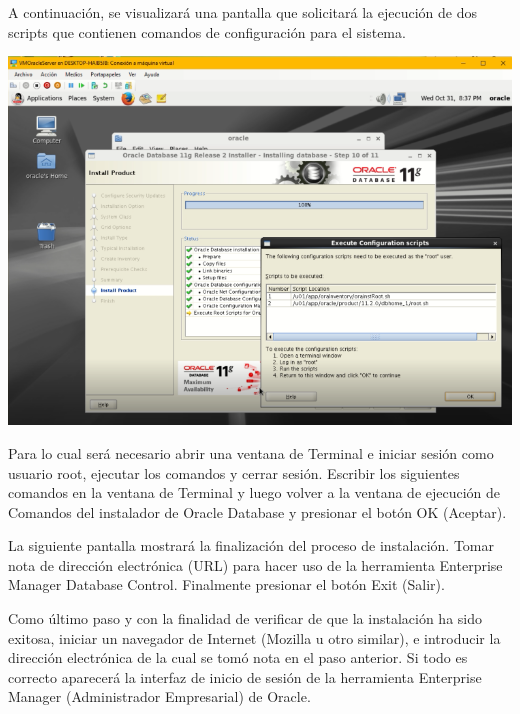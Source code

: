 \vspace{\baselineskip}

A continuación, se visualizará una pantalla que solicitará la ejecución de dos scripts que contienen comandos de configuración para el sistema.
\begin{center}
	\includegraphics[width=16cm]{./Imagenes/85} 
\end{center}

\vspace{\baselineskip}

Para lo cual será necesario abrir una ventana de Terminal e iniciar sesión como usuario root, ejecutar los comandos y cerrar sesión. Escribir los siguientes comandos en la ventana de Terminal y luego volver a la ventana de ejecución de Comandos del instalador de Oracle Database y presionar el botón OK (Aceptar).

\vspace{\baselineskip}

La siguiente pantalla mostrará la finalización del proceso de instalación. Tomar nota de dirección electrónica (URL) para hacer uso de la herramienta Enterprise Manager Database Control. Finalmente presionar el botón Exit (Salir).

\vspace{\baselineskip}

Como último paso y con la finalidad de verificar de que la instalación ha sido exitosa, iniciar un navegador de Internet (Mozilla u otro similar), e introducir la dirección electrónica de la cual se tomó nota en el paso anterior. Si todo es correcto aparecerá la interfaz de inicio de sesión de la herramienta Enterprise Manager (Administrador Empresarial) de Oracle.